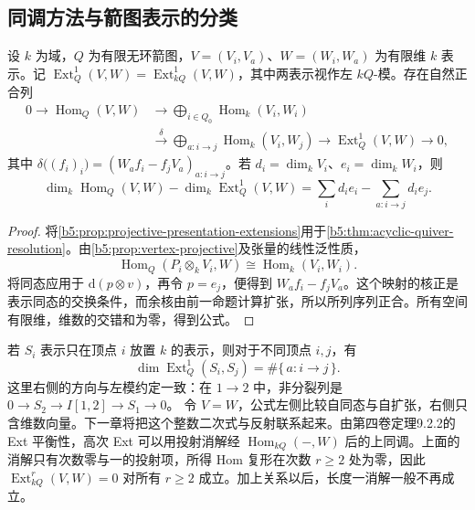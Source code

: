\subsection{同调方法与箭图表示的分类}
\label{b5:subsec:0904:03}

\begin{theorem}\label{b5:thm:quiver-hom-ext-euler}
	设 \(k\) 为域，\(Q\) 为有限无环箭图，\(V=(V_i,V_a)\)、\(W=(W_i,W_a)\) 为有限维 \(k\) 表示。记 \(\operatorname{Ext}_Q^1(V,W)=\operatorname{Ext}_{kQ}^1(V,W)\)，其中两表示视作左 \(kQ\)-模。存在自然正合列
	\[
		\begin{split}
			0\longrightarrow\operatorname{Hom}_Q(V,W) &\longrightarrow\bigoplus_{i\in Q_0}\operatorname{Hom}_k(V_i,W_i)\\
			&\xrightarrow{\delta} \bigoplus_{a:i\to j}\operatorname{Hom}_k(V_i,W_j) \longrightarrow\operatorname{Ext}_Q^1(V,W)\longrightarrow0,
		\end{split}
	\]
	其中 \(\delta\bigl((f_i)_i\bigr)=(W_af_i-f_jV_a)_{a:i\to j}\)。若 \(d_i=\dim_k V_i\)、\(e_i=\dim_k W_i\)，则
	\[
		\dim_k\operatorname{Hom}_Q(V,W)-\dim_k\operatorname{Ext}_Q^1(V,W) =\sum_i d_i e_i-\sum_{a:i\to j}d_i e_j.
	\]
\end{theorem}
\begin{proof}
	将\cref{b5:prop:projective-presentation-extensions}用于\cref{b5:thm:acyclic-quiver-resolution}。由\cref{b5:prop:vertex-projective}及张量的线性泛性质，
	\[
		\operatorname{Hom}_Q(P_i\otimes_k V_i,W) \cong\operatorname{Hom}_k(V_i,W_i).
	\]
	将同态应用于 \(\mathrm{d}(p\otimes v)\)，再令 \(p=e_j\)，便得到 \(W_af_i-f_jV_a\)。这个映射的核正是表示同态的交换条件，而余核由前一命题计算扩张，所以所列序列正合。所有空间有限维，维数的交错和为零，得到公式。
\end{proof}
若 \(S_i\) 表示只在顶点 \(i\) 放置 \(k\) 的表示，则对于不同顶点 \(i,j\)，有
\[
	\dim\operatorname{Ext}_Q^1(S_i,S_j) =\#\{\,a:i\to j\,\}.
\]
这里右侧的方向与左模约定一致：在 \(1\to2\) 中，非分裂列是 \(0\to S_2\to I[1,2]\to S_1\to0\)。
\ProseParagraphBreak
令 \(V=W\)，公式左侧比较自同态与自扩张，右侧只含维数向量。下一章将把这个整数二次式与反射联系起来。由第四卷定理9.2.2的 Ext 平衡性，高次 Ext 可以用投射消解经 \(\operatorname{Hom}_{kQ}(-,W)\) 后的上同调。上面的消解只有次数零与一的投射项，所得 Hom 复形在次数 \(r\ge2\) 处为零，因此 \(\operatorname{Ext}_{kQ}^r(V,W)=0\) 对所有 \(r\ge2\) 成立。加上关系以后，长度一消解一般不再成立。


